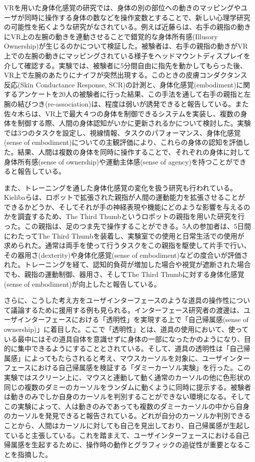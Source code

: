 VRを用いた身体化感覚の研究では、身体の別の部位への動きのマッピングやユーザが同時に操作する身体の数などを操作変数とすることで、新しい心理学研究の可能性を拓くような研究がなされている。例えば近藤ら\cite{Kondo2020}は、右手の親指の動きにVR上の左腕の動きを連動させることで錯覚的な身体所有感(Illusory Ownership)が生じるのかについて検証した。被験者は、右手の親指の動きがVR上での左腕の動きにマッピングされている様子をヘッドマウントディスプレイを介して確認する。実験では、被験者に5分間自由に指先を動かしてもらった後、VR上で左腕のあたりにナイフが突然出現する。このときの皮膚コンダクタンス反応(Skin Conductance Response, SCR)の計測と、身体化感覚(embodiment)に関するアンケートを20人の被験者に行った結果、この手法を通して右手の親指と左腕の結びつき(re-association)は、程度は弱いが誘発できると報告している。また佐々木ら\cite{sasaki2022multisoma}は、VR上で最大４つの身体を制御できるシステムを実装し、複数の身体を制御する際、人間の身体認知がいかに更新されるかについて検討した。実験では3つのタスクを設定し、視線情報、タスクのパフォーマンス、身体化感覚(sense of embodiment)についての主観評価により、これらの身体の認知を評価した。結果、人間は複数の身体を同時に操作することで、それぞれの身体に対して身体所有感(sense of ownership)や運動主体感(sense of agency)を持つことができると報告している。

また、トレーニングを通した身体化感覚の変化を扱う研究も行われている。Kielibaら\cite{kieliba2021robotic}は、ロボットで拡張された親指が人間の運動能力を拡張させることができるかどうか、そしてそれが手の神経表現や機能にどのような影響を与えるのかを調査するため、The Third Thumbというロボットの親指を用いた研究を行った。この親指は、足のつま先で操作することができる。5人の参加者は、5日間にわたってThe Third Thumbを装着し、実験室での使用と日常生活での使用が求められた。通常は両手を使って行うタスクをこの親指を駆使して片手で行い、その器用さ(dexterity)や身体化感覚(sense of embodiment)などの度合いが評価された。トレーニングを経て、認知的負荷が増加した場合や視覚が遮断された場合でも、親指の運動制御、器用さ、そしてThe Third Thumbに対する身体化感覚(sense of embodiment)が向上したと報告している。

さらに、こうした考え方をユーザインターフェースのような道具の操作性について議論するために援用する例も見られる。インターフェース研究者の渡邊は、ユーザインターフェースにおける「透明性」を実現する上で「自己帰属感(sense of ownership)」に着目した\cite{Watanabe2017}。ここで「透明性」とは、道具の使用において、使っている最中にはその道具自体を意識せずに身体の一部になったかのようになり、目的に集中できるようにすることとされている。そして、道具の透明性は「自己帰属感」によってもたらされると考え、マウスカーソルを対象に、ユーザインターフェースにおける自己帰属感を検証する「ダミーカーソル実験」を行った\cite{Watanabe2013}。この実験ではスクリーン上に、マウスと連動して動く通常のカーソルの他に色形状の同じの複数のダミーのカーソルをランダムに動くように同時に提示する。被験者は動きのみでしか自身のカーソルを判別することができない環境になる。そしてこの実験によって、人は動きのみであっても複数のダミーカーソルの中から自身のカーソルを発見できると報告されている。どれが自分のカーソルか判別できることから、人間はカーソルに対しても自己を見出しており、自己帰属感が生起していると主張している。これを踏まえて、ユーザインターフェースにおける自己帰属感を生起するために、操作時の動作とグラフィックの追従性が重要となることを指摘した。


